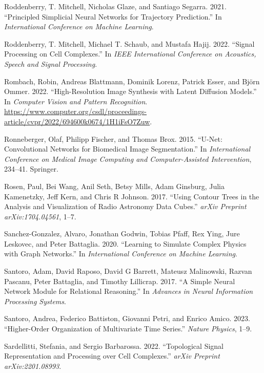 \documentclass[
  12pt,
]{krantz}
\newlength{\cslhangindent}
\newenvironment{CSLReferences}[2] %
 {\begin{list}{}{%
  \setlength{\itemindent}{0pt}
  \setlength{\leftmargin}{0pt}
  \setlength{\parsep}{0pt}
  \ifodd #1
   \setlength{\leftmargin}{\cslhangindent}
   \setlength{\itemindent}{-1\cslhangindent}
  \fi
  \setlength{\itemsep}{#2\baselineskip}}}
 {\end{list}}
\begin{document}
\begin{CSLReferences}{1}{0}
Roddenberry, T. Mitchell, Nicholas Glaze, and Santiago Segarra. 2021.
{``Principled Simplicial Neural Networks for Trajectory Prediction.''}
In \emph{International Conference on Machine Learning}.

Roddenberry, T. Mitchell, Michael T. Schaub, and Mustafa Hajij. 2022.
{``Signal Processing on Cell Complexes.''} In \emph{IEEE International
Conference on Acoustics, Speech and Signal Processing}.

Rombach, Robin, Andreas Blattmann, Dominik Lorenz, Patrick Esser, and
Björn Ommer. 2022. {``High-Resolution Image Synthesis with Latent
Diffusion Models.''} In \emph{Computer Vision and Pattern Recognition}.
\url{https://www.computer.org/csdl/proceedings-article/cvpr/2022/694600k0674/1H1iFsO7Zuw}.

Ronneberger, Olaf, Philipp Fischer, and Thomas Brox. 2015. {``U-{N}et:
Convolutional Networks for Biomedical Image Segmentation.''} In
\emph{International Conference on Medical Image Computing and
Computer-Assisted Intervention}, 234--41. Springer.

Rosen, Paul, Bei Wang, Anil Seth, Betsy Mills, Adam Ginsburg, Julia
Kamenetzky, Jeff Kern, and Chris R Johnson. 2017. {``Using Contour Trees
in the Analysis and Visualization of Radio Astronomy Data Cubes.''}
\emph{arXiv Preprint arXiv:1704.04561}, 1--7.

Sanchez-Gonzalez, Alvaro, Jonathan Godwin, Tobias Pfaff, Rex Ying, Jure
Leskovec, and Peter Battaglia. 2020. {``Learning to Simulate Complex
Physics with Graph Networks.''} In \emph{International Conference on
Machine Learning}.

Santoro, Adam, David Raposo, David G Barrett, Mateusz Malinowski, Razvan
Pascanu, Peter Battaglia, and Timothy Lillicrap. 2017. {``A Simple
Neural Network Module for Relational Reasoning.''} In \emph{Advances in
Neural Information Processing Systems}.

Santoro, Andrea, Federico Battiston, Giovanni Petri, and Enrico Amico.
2023. {``Higher-Order Organization of Multivariate Time Series.''}
\emph{Nature Physics}, 1--9.

Sardellitti, Stefania, and Sergio Barbarossa. 2022. {``Topological
Signal Representation and Processing over Cell Complexes.''} \emph{arXiv
Preprint arXiv:2201.08993}.


\end{CSLReferences}
\end{document}
